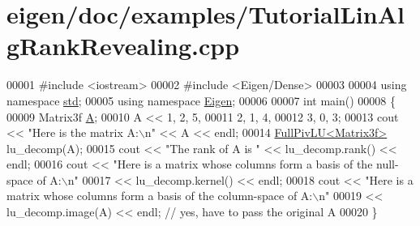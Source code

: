 \hypertarget{eigen_2doc_2examples_2_tutorial_lin_alg_rank_revealing_8cpp_source}{}\section{eigen/doc/examples/\+Tutorial\+Lin\+Alg\+Rank\+Revealing.cpp}
\label{eigen_2doc_2examples_2_tutorial_lin_alg_rank_revealing_8cpp_source}

\begin{DoxyCode}
00001 \textcolor{preprocessor}{#include <iostream>}
00002 \textcolor{preprocessor}{#include <Eigen/Dense>}
00003 
00004 \textcolor{keyword}{using namespace }\hyperlink{namespacestd}{std};
00005 \textcolor{keyword}{using namespace }\hyperlink{namespace_eigen}{Eigen};
00006 
00007 \textcolor{keywordtype}{int} main()
00008 \{
00009    Matrix3f \hyperlink{group___core___module_class_eigen_1_1_matrix}{A};
00010    A << 1, 2, 5,
00011         2, 1, 4,
00012         3, 0, 3;
00013    cout << \textcolor{stringliteral}{"Here is the matrix A:\(\backslash\)n"} << A << endl;
00014    \hyperlink{group___l_u___module_class_eigen_1_1_full_piv_l_u}{FullPivLU<Matrix3f>} lu\_decomp(A);
00015    cout << \textcolor{stringliteral}{"The rank of A is "} << lu\_decomp.rank() << endl;
00016    cout << \textcolor{stringliteral}{"Here is a matrix whose columns form a basis of the null-space of A:\(\backslash\)n"}
00017         << lu\_decomp.kernel() << endl;
00018    cout << \textcolor{stringliteral}{"Here is a matrix whose columns form a basis of the column-space of A:\(\backslash\)n"}
00019         << lu\_decomp.image(A) << endl; \textcolor{comment}{// yes, have to pass the original A}
00020 \}
\end{DoxyCode}
